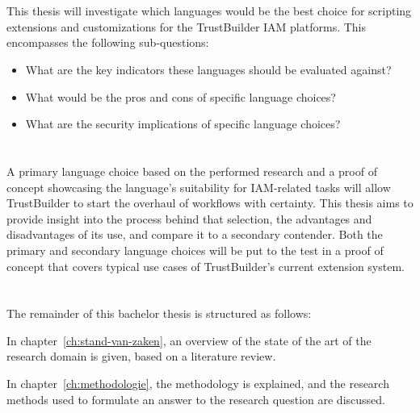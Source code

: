 \section{}%
\label{sec:onderzoeksvraag}

This thesis will investigate which languages would be the best choice for scripting extensions and customizations for the TrustBuilder IAM platforms. This encompasses the following sub-questions: 
\begin{itemize}
    \item{What are the key indicators these languages should be evaluated against?}
    \item{What would be the pros and cons of specific language choices?}
    \item{What are the security implications of specific language choices?}
\end{itemize}

\section{}%
\label{sec:onderzoeksdoelstelling}

A primary language choice based on the performed research and a proof of concept showcasing the language’s suitability for IAM-related tasks will allow TrustBuilder to start the overhaul of workflows with certainty.
This thesis aims to provide insight into the process behind that selection, the advantages and disadvantages of its use, and compare it to a secondary contender. Both the primary and secondary language choices will be put to the test in a proof of concept that covers typical use cases of TrustBuilder's current extension system.

\section{}%
\label{sec:opzet-bachelorproef}

The remainder of this bachelor thesis is structured as follows:

In chapter~\ref{ch:stand-van-zaken}, an overview of the state of the art of the research domain is given, based on a literature review.

In chapter~\ref{ch:methodologie}, the methodology is explained, and the research methods used to formulate an answer to the research question are discussed.


